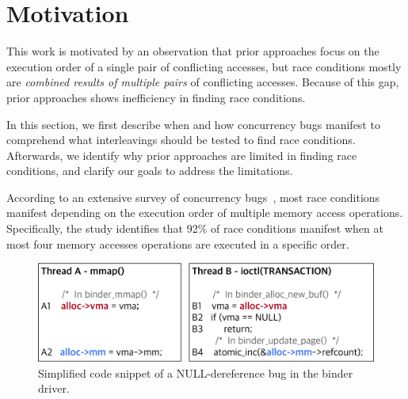 \section{Motivation}
\label{s:motivation}



This work is motivated by an observation that prior approaches
focus on the execution order of a single pair of conflicting
accesses, but race conditions mostly are \textit{combined results of multiple pairs} 
of conflicting accesses.
%
Because of this gap, prior approaches shows inefficiency in finding race
conditions.

In this section, we first describe when and how concurrency bugs
manifest to comprehend what interleavings should be tested to find
race conditions.
%
Afterwards, we identify why prior approaches are limited in finding
race conditions, and clarify our goals to address the limitations.


%
According to an extensive survey of concurrency
bugs~\cite{learningfrommistakes}, most race conditions manifest
depending on the execution order of multiple memory access operations.
%
Specifically, the study identifies that 92\% of race conditions manifest 
when at most four memory accesses operations are executed in a specific
order.
%

\begin{figure}[t]
  \centering
  \includegraphics[width=0.95\linewidth]{fig/cve-2017-10661.pdf}
  \caption{Simplified code snippet of a NULL-dereference bug in the
    binder driver.}
  \label{fig:cve-2019-6974}
\end{figure}

